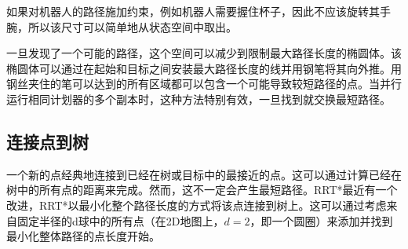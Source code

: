 如果对机器人的路径施加约束，例如机器人需要握住杯子，因此不应该旋转其手腕，所以该尺寸可以简单地从状态空间中取出。


一旦发现了一个可能的路径，这个空间可以减少到限制最大路径长度的椭圆体。该椭圆体可以通过在起始和目标之间安装最大路径长度的线并用钢笔将其向外推。用钢丝夹住的笔可以达到的所有区域都可以包含一个可能导致较短路径的点。当并行运行相同计划器的多个副本时，这种方法特别有效，一旦找到\cite{otte2012}就交换最短路径。


\subsection{连接点到树}
一个新的点经典地连接到已经在树或目标中的最接近的点。这可以通过计算已经在树中的所有点的距离来完成。然而，这不一定会产生最短路径。RRT*最近有一个改进，RRT*以最小化整个路径长度的方式将该点连接到树上。这可以通过考虑来自固定半径的d球中的所有点（在2D地图上，$d=2$，即一个圆圈）来添加并找到最小化整体路径的点长度开始。


